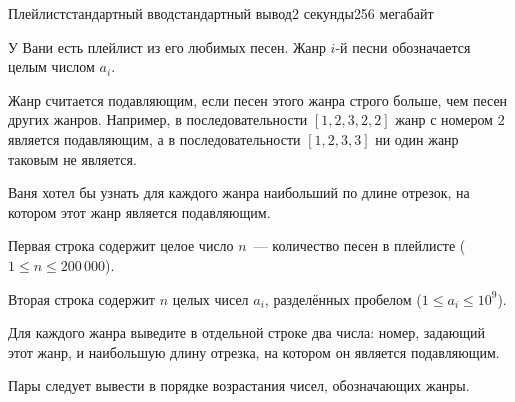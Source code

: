 \begin{problem}{Плейлист}{стандартный ввод}{стандартный вывод}{2 секунды}{256 мегабайт}

У Вани есть плейлист из его любимых песен. Жанр $i$-й песни обозначается целым числом  $a_i$.

Жанр считается подавляющим, если песен этого жанра строго больше, чем песен других жанров. Например, в последовательности $[1, 2, 3, 2, 2]$ жанр с номером $2$ является подавляющим, а в последовательности $[1, 2, 3, 3]$ ни один жанр таковым не является.

Ваня хотел бы узнать для каждого жанра наибольший по длине отрезок, на котором этот жанр является подавляющим. 

\InputFile
Первая строка содержит целое число $n$~--- количество песен в плейлисте ($1 \leq n \leq 200\,000$).

Вторая строка содержит $n$ целых чисел $a_i$, разделённых пробелом ($1 \leq a_i \leq 10^9$).

\OutputFile
Для каждого жанра выведите в отдельной строке два числа: номер, задающий этот жанр, и наибольшую длину отрезка, на котором он является подавляющим.

Пары следует вывести в порядке возрастания чисел, обозначающих жанры.

\Examples

\begin{example}
%
%
\end{example}

\end{problem}

